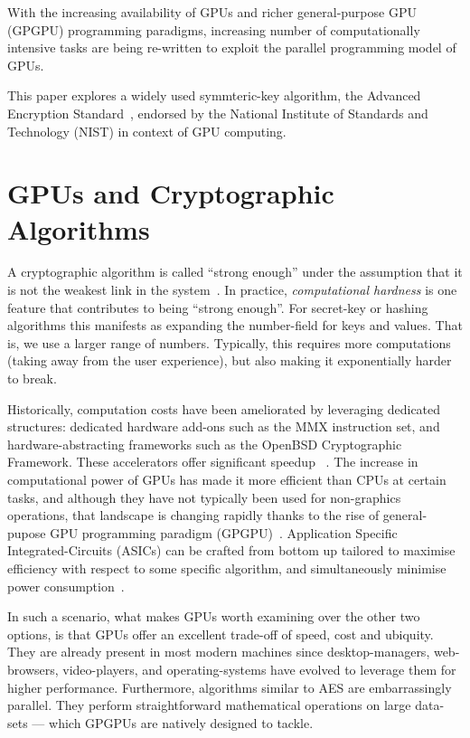 \documentclass[letterpaper,twocolumn,10pt]{article}
\begin{document}
With the increasing availability of GPUs and richer general-purpose GPU (GPGPU) programming paradigms, increasing number of computationally intensive tasks are being re-written to exploit the parallel programming model of GPUs. 

This paper explores a widely used symmteric-key algorithm, the Advanced Encryption Standard~\cite{AES}, endorsed by the National Institute of Standards and Technology (NIST) in context of GPU computing.  

\section{GPUs and Cryptographic Algorithms}
A cryptographic algorithm is called ``strong enough'' under the assumption that it is not the weakest link in the system~\cite{strongEnough}.
In practice, \textit{computational hardness} is one feature that contributes to being ``strong enough''.
For secret-key or hashing algorithms this manifests as expanding the number-field for keys and values. That is, we use a larger range of numbers.
Typically, this requires more computations (taking away from the user experience), but also making it exponentially harder to break.

Historically, computation costs have been ameliorated by leveraging dedicated structures: dedicated hardware add-ons such as the MMX instruction set, and hardware-abstracting frameworks such as the OpenBSD Cryptographic Framework. These accelerators offer significant speedup ~\cite{ocf_design}.
The increase in computational power of GPUs has made it more efficient than CPUs at certain tasks, and although they have not typically been used for non-graphics operations, that landscape is changing rapidly thanks to the rise of general-pupose GPU programming paradigm (GPGPU)~\cite{cryptographics}.
Application Specific Integrated-Circuits (ASICs) can be crafted from bottom up tailored to maximise efficiency with respect to some specific algorithm, and simultaneously minimise power consumption~\cite{bhatnagar}.

In such a scenario, what makes GPUs worth examining over the other two options, is that GPUs offer an excellent trade-off of speed, cost and ubiquity.
They are already present in most modern machines since desktop-managers, web-browsers, video-players, and operating-systems have evolved to leverage them for higher performance.
Furthermore, algorithms similar to AES are embarrassingly parallel. They perform straightforward mathematical operations on large data-sets --- which GPGPUs are natively designed to tackle.
\end{document}
